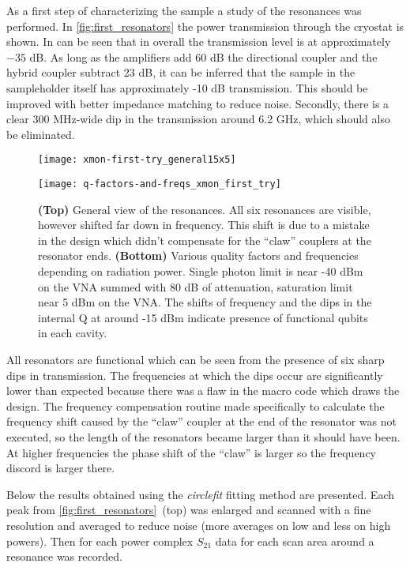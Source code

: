 \documentclass[12pt, twoside]{report}
\numberwithin{equation}{section}
\begin{document}
As a first step of characterizing the sample a study of the resonances was performed. In \autoref{fig:first_resonators} the power transmission through the cryostat is shown. In can be seen that in overall the transmission level is at approximately $-35$ dB. As long as the amplifiers add 60 dB the directional coupler and the hybrid coupler subtract 23 dB, it can be inferred that the sample in the sampleholder itself has approximately -10 dB transmission. This should be improved with better impedance matching to reduce noise. Secondly, there is a clear 300 MHz-wide dip in the transmission around 6.2 GHz, which should also be eliminated.

\begin{figure}
\centering
\texttt{[image: xmon-first-try\_general15x5]}

\texttt{[image: q-factors-and-freqs\_xmon\_first\_try]}

\caption{\textbf{(Top)} General view of the resonances. All six resonances are visible, however shifted far down in frequency. This shift is due to a mistake in the design which didn't compensate for the ``claw'' couplers at the resonator ends. \textbf{(Bottom)} Various quality factors and frequencies depending on radiation power. Single photon limit is near -40 dBm on the VNA summed with 80 dB of attenuation, saturation limit near 5 dBm on the VNA. The shifts of frequency and the dips in the internal Q at around -15 dBm indicate presence of functional qubits in each cavity.}
\label{fig:first_resonators}
\end{figure}

All resonators are functional which can be seen from the presence of six sharp dips in transmission. The frequencies at which the dips occur are significantly lower than expected because there was a flaw in the macro code which draws the design. The frequency compensation routine made specifically to calculate the frequency shift\cite{Sank2014} caused by the ``claw'' coupler at the end of the resonator was not executed, so the length of the resonators became larger than it should have been. At higher frequencies the phase shift of the ``claw'' is larger so the frequency discord is larger there.

Below the results obtained using the \textit{circlefit}\cite{probst2015} fitting method are presented. Each peak from \autoref{fig:first_resonators}~(top) was enlarged and scanned with a fine resolution and averaged to reduce noise (more averages on low and less on high powers). Then for each power complex $S_{21}$ data for each scan area around a resonance was recorded.
\end{document}
